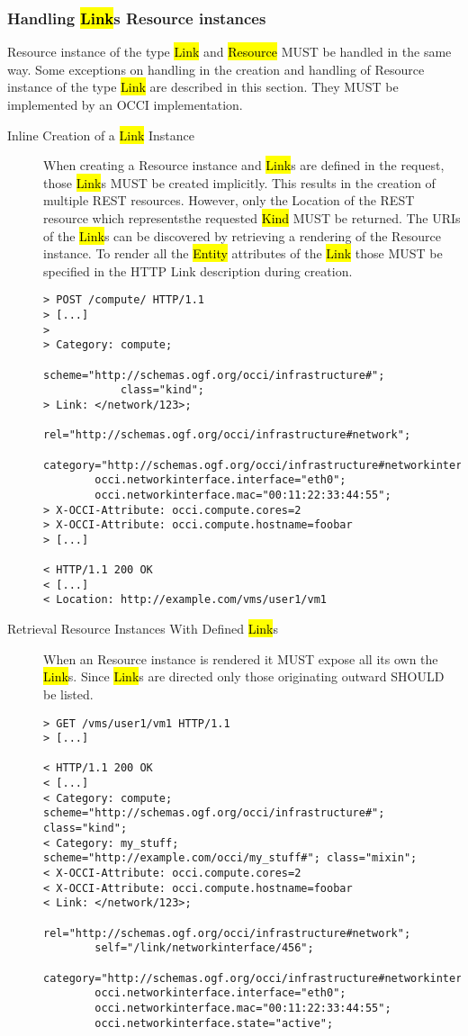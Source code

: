 \documentclass[10pt,a4paper]{article}
\begin{document}
\subsubsection{Handling \hl{Link}s Resource instances}
Resource instance of the type \hl{Link} and \hl{Resource} MUST be
handled in the same way. Some exceptions on handling in the creation
and handling of Resource instance of the type \hl{Link} are described
in this section. They MUST be implemented by an OCCI implementation.

\begin{description}
  \item[Inline Creation of a \hl{Link} Instance] 
    When creating a Resource instance and \hl{Link}s are defined in the 
    request, those \hl{Link}s MUST be
    created implicitly. This results in the creation of multiple REST
    resources. However, only the Location of the REST resource which
    representsthe requested \hl{Kind} MUST be returned. The URIs of
    the \hl{Link}s can be discovered by retrieving a rendering of the
    Resource instance. To render all the \hl{Entity} attributes of
    the \hl{Link} those MUST be specified in the HTTP Link description
    during creation.

\begin{verbatim}
> POST /compute/ HTTP/1.1
> [...]
> 
> Category: compute; 
            scheme="http://schemas.ogf.org/occi/infrastructure#"; 
            class="kind"; 
> Link: </network/123>;
        rel="http://schemas.ogf.org/occi/infrastructure#network";
        category="http://schemas.ogf.org/occi/infrastructure#networkinterface";
        occi.networkinterface.interface="eth0";
        occi.networkinterface.mac="00:11:22:33:44:55";
> X-OCCI-Attribute: occi.compute.cores=2
> X-OCCI-Attribute: occi.compute.hostname=foobar
> [...]
 
< HTTP/1.1 200 OK
< [...]
< Location: http://example.com/vms/user1/vm1
\end{verbatim}

  \item[Retrieval Resource Instances With
    Defined \hl{Link}s] When an Resource instance is rendered it 
    MUST expose all its own the \hl{Link}s. Since \hl{Link}s are
    directed only those originating outward SHOULD be listed.

\begin{verbatim}
> GET /vms/user1/vm1 HTTP/1.1
> [...]
 
< HTTP/1.1 200 OK
< [...]
< Category: compute; scheme="http://schemas.ogf.org/occi/infrastructure#"; class="kind";
< Category: my_stuff; scheme="http://example.com/occi/my_stuff#"; class="mixin";
< X-OCCI-Attribute: occi.compute.cores=2
< X-OCCI-Attribute: occi.compute.hostname=foobar
< Link: </network/123>;
        rel="http://schemas.ogf.org/occi/infrastructure#network";
        self="/link/networkinterface/456";
        category="http://schemas.ogf.org/occi/infrastructure#networkinterface";
        occi.networkinterface.interface="eth0";
        occi.networkinterface.mac="00:11:22:33:44:55";
        occi.networkinterface.state="active";
\end{verbatim}


\end{description}
\end{document}
